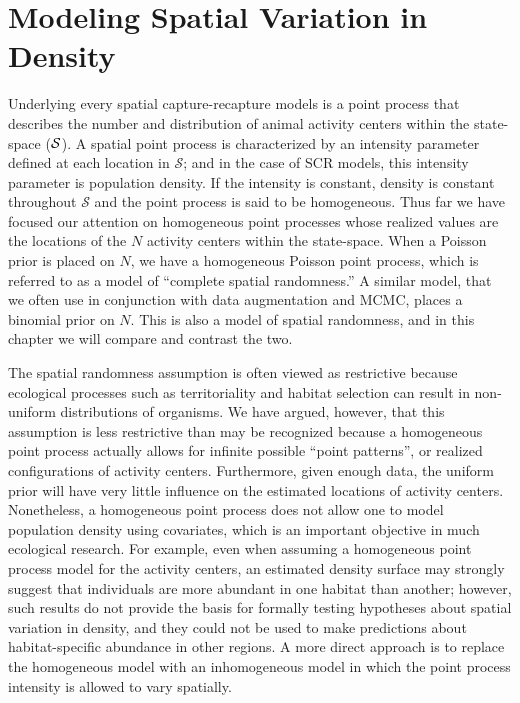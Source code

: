 \chapter{
Modeling Spatial Variation in Density
}
\label{chapt.state-space}

\vspace{0.3cm}

Underlying every spatial capture-recapture models is a point process
that describes the number and distribution of animal activity
centers within the state-space ($\cal{S}$).
A spatial point process is characterized by %
an intensity parameter defined at each location in $\mathcal{S}$; and
in the case of SCR models, this intensity parameter is population
density. If the intensity is constant, density is constant throughout
$\mathcal{S}$ and the point process is said to be homogeneous.
Thus far we have focused our attention on homogeneous %
point processes whose realized values are the locations of the $N$
activity centers within the state-space. When a Poisson prior is
placed on $N$, we have a homogeneous Poisson point process, which
is referred to as a model of ``complete spatial randomness.''
A similar model, that we often use in conjunction with data
augmentation and MCMC, places a binomial prior on $N$. This is also a
model of spatial randomness, and in this chapter we will compare and
contrast the two.

The spatial randomness assumption is often viewed as restrictive
because ecological processes such as
territoriality and habitat selection can result in non-uniform
distributions of organisms. We have argued, however, that this
assumption is less restrictive than may be recognized because a
homogeneous point process actually allows for infinite
possible ``point patterns'', or realized configurations of activity
centers. Furthermore, given enough data,
the uniform prior will have very little influence on the estimated
locations of activity centers. Nonetheless, a homogeneous point
process does not allow one to model population density using
covariates, which is an important objective in much ecological research.
For example, even when assuming a homogeneous point process model for
the activity centers, an estimated density surface may strongly
suggest that individuals are more abundant in one habitat than
another; however, such results do not provide the basis for formally testing
hypotheses about spatial variation in density, and they could not be
used to make predictions about habitat-specific abundance in other
regions. A more direct approach is to replace the homogeneous model
with an inhomogeneous model in which the point process intensity
is allowed to vary spatially.

